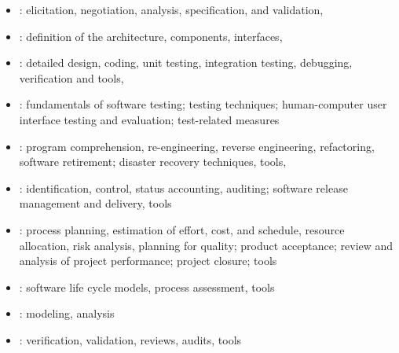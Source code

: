 \begin{minipage}{0.48\linewidth}
\fi
\begin{itemize}
\item {}: elicitation, negotiation, analysis,
  specification, and validation,
  \item {}: definition of the architecture, components, interfaces,
  \item {}: detailed design, coding, unit testing,
    integration testing, debugging, verification and tools,
  \item {}: fundamentals of software testing; testing techniques;
    human-computer user interface testing and evaluation; test-related measures
  \item {}: program comprehension, re-engineering,
    reverse engineering, refactoring, software retirement; disaster recovery techniques, tools,
\newslide
\end{itemize}
\ifslides
\newslide
\else
\end{minipage}
\hfill
\begin{minipage}{0.48\linewidth}
\fi
\begin{itemize}
\item {}: identification, control,
  status accounting, auditing; software release management and delivery, tools
\item {}: process planning,
  estimation of effort, cost, and schedule, resource allocation, risk analysis,
  planning for quality;
  product acceptance; review and analysis of project performance; project closure; tools
\item {}: software life cycle models,
  process assessment, tools
  \item {}: modeling, analysis %
  \item {}: verification, validation, reviews, audits, tools
\end{itemize}
\ifslides
\else
\end{minipage}
\hfill
